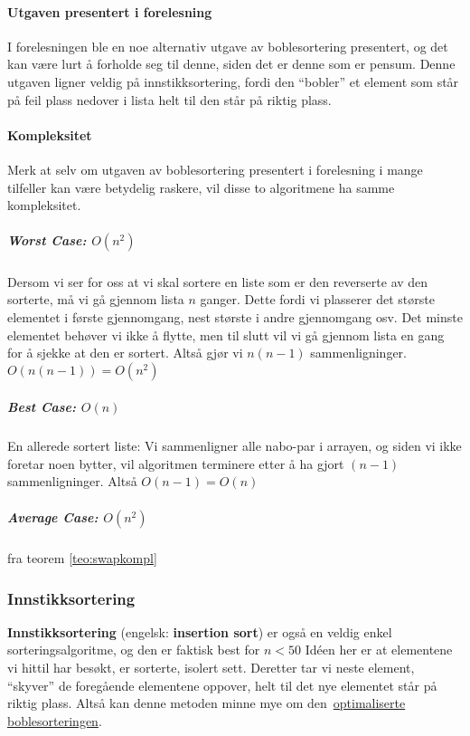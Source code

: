 
\paragraph*{Utgaven presentert i forelesning}\label{sec:bubbleoptimal}
I forelesningen ble en noe alternativ utgave av boblesortering presentert, og det kan være lurt å forholde seg til denne, siden det er denne som er pensum.
Denne utgaven ligner veldig på innstikksortering, fordi den ``bobler'' et element som står på feil plass nedover i lista helt til den står på riktig plass.


\paragraph{Kompleksitet}
Merk at selv om utgaven av boblesortering presentert i forelesning i mange tilfeller kan være
betydelig raskere, vil disse to algoritmene ha samme kompleksitet.

\subparagraph{Worst Case: $O(n^2)$} Dersom vi ser for oss at vi skal sortere en
liste som er den reverserte av den sorterte, må vi gå gjennom lista $n$ ganger.
Dette fordi vi plasserer det største elementet i første gjennomgang, nest
største i andre gjennomgang osv. Det minste elementet behøver vi ikke å flytte,
men til slutt vil vi gå gjennom lista en gang for å sjekke at den er sortert.
Altså gjør vi $n(n-1)$ sammenligninger. $O(n(n-1)) = O(n^2 )$

\subparagraph{Best Case: $O(n)$} En allerede sortert liste: Vi sammenligner alle nabo-par i arrayen, og
siden vi ikke foretar noen bytter, vil algoritmen terminere etter å ha gjort
$(n-1)$ sammenligninger. Altså $O(n-1) = O(n)$

\subparagraph{Average Case: $O(n^2)$} fra teorem \ref{teo:swapkompl}


\subsubsection{Innstikksortering}\label{insertsort}
\textbf{Innstikksortering} (engelsk: \textbf{insertion sort}) er også en veldig enkel sorteringsalgoritme, og den er faktisk best for $n<50$
Idéen her er at elementene vi hittil har besøkt, er sorterte, isolert sett.
Deretter tar vi neste element, ``skyver'' de foregående elementene oppover,
helt til det nye elementet står på riktig plass.
Altså kan denne metoden minne mye om den~\hyperref[sec:bubbleoptimal]{optimaliserte boblesorteringen}. 


